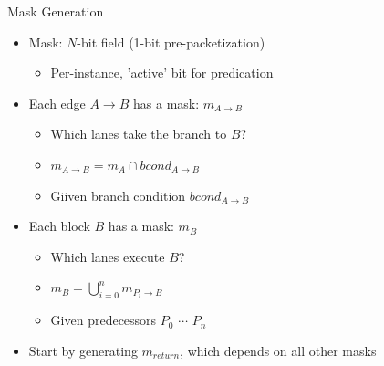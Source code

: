 \begin{frame}{Mask Generation}

\begin{minipage}[t]{0.50\linewidth}

\begin{itemize}
    \item Mask: $N$-bit field (1-bit pre-packetization)
    \begin{itemize}
        \item Per-instance, 'active' bit for predication
    \end{itemize}
    \item Each edge $A \rightarrow B$ has a mask: $m_{A \rightarrow B}$
    \begin{itemize}
        \item Which lanes take the branch to $B$?
        \item $m_{A \rightarrow B} = m_A \cap bcond_{A \rightarrow B}$
        \item Giiven branch condition $bcond_{A \rightarrow B}$
    \end{itemize}
    \item Each block $B$ has a mask: $m_B$
    \begin{itemize}
        \item Which lanes execute $B$?
        \item $m_B = \bigcup\limits_{i=0}^n  m_{P_i \rightarrow B}$
        \item Given predecessors $P_0$ $\cdots$ $P_n$
    \end{itemize}
    \item Start by generating $m_{return}$, which depends on all other masks
\end{itemize}

\end{minipage}
\hspace{1em}
\begin{minipage}[t]{0.43\linewidth}

\vspace{0.1ex}

\end{minipage}

\end{frame}


